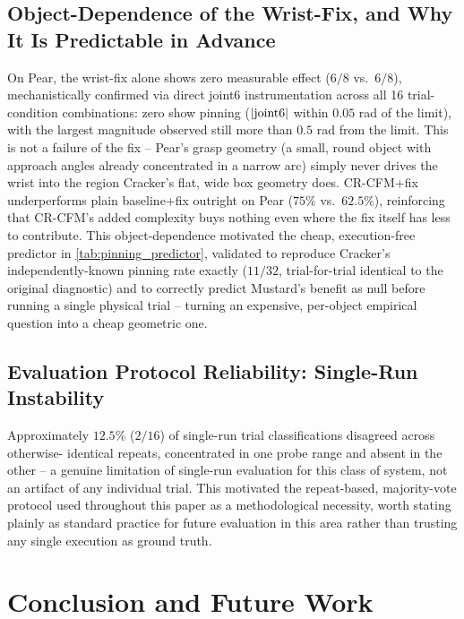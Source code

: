\documentclass[]{interact}
\begin{document}
\subsection{Object-Dependence of the Wrist-Fix, and Why It Is Predictable in Advance}
On Pear, the wrist-fix alone shows zero measurable effect ($6/8$ vs.\ $6/8$), mechanistically
confirmed via direct joint6 instrumentation across all 16 trial-condition combinations: zero show
pinning ($|{\rm joint6}| $ within $0.05$ rad of the limit), with the largest magnitude observed still
more than $0.5$ rad from the limit. This is not a failure of the fix -- Pear's grasp geometry (a
small, round object with approach angles already concentrated in a narrow arc) simply never drives
the wrist into the region Cracker's flat, wide box geometry does. CR-CFM+fix underperforms plain
baseline+fix outright on Pear ($75\%$ vs.\ $62.5\%$), reinforcing that CR-CFM's added complexity
buys nothing even where the fix itself has less to contribute. This object-dependence motivated the
cheap, execution-free predictor in \cref{tab:pinning_predictor}, validated to reproduce Cracker's
independently-known pinning rate exactly ($11/32$, trial-for-trial identical to the original
diagnostic) and to correctly predict Mustard's benefit as null before running a single physical
trial -- turning an expensive, per-object empirical question into a cheap geometric one.

\subsection{Evaluation Protocol Reliability: Single-Run Instability}
Approximately $12.5\%$ ($2/16$) of single-run trial classifications disagreed across otherwise-
identical repeats, concentrated in one probe range and absent in the other -- a genuine limitation
of single-run evaluation for this class of system, not an artifact of any individual trial. This
motivated the repeat-based, majority-vote protocol used throughout this paper as a methodological
necessity, worth stating plainly as standard practice for future evaluation in this area rather than
trusting any single execution as ground truth.

\section{Conclusion and Future Work}
\end{document}
